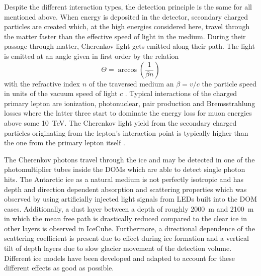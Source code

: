Despite the different interaction types, the detection principle is the same for all mentioned above.
When energy is deposited in the detector, secondary charged particles are created which, at the high energies considered here, travel through the matter faster than the effective speed of light in the medium.
During their passage through matter, Cherenkov light gets emitted along their path.
The light is emitted at an angle given in first order by the relation
\begin{equation}
  \Theta = \arccos\left(\frac{1}{\beta n}\right)
\end{equation}
with the refractive index $n$ of the traversed medium an $\beta = v/c$ the particle speed in units of the vacuum speed of light $c$ .
Typical interactions of the charged primary lepton are ionization, photonuclear, pair production and Bremsstrahlung losses where the latter three start to dominate the energy loss for muon energies above some \SI{10}{\tera\eV}.
The Cherenkov light yield from the secondary charged particles originating from the lepton's interaction point is typically higher than the one from the primary lepton itself .

The Cherenkov photons travel through the ice and may be detected in one of the photomultiplier tubes inside the DOMs which are able to detect single photon hits.
The Antarctic ice as a natural medium is not perfectly isotropic and has depth and direction dependent absorption and scattering properties which was observed by using artificially injected light signals from LEDs built into the DOM cases.
Additionally, a dust layer between a depth of roughly \SI{2000}{\m} and \SI{2100}{\m} in which the mean free path is drastically reduced compared to the clear ice in other layers is observed in IceCube.
Furthermore, a directional dependence of the scattering coefficient is present due to effect during ice formation and a vertical tilt of depth layers due to slow glacier movement of the detection volume.
Different ice models have been developed and adapted to account for these different effects as good as possible.

